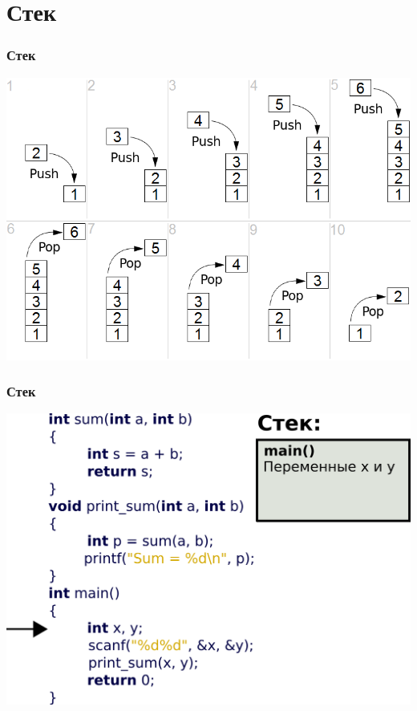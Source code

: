 \documentclass[12pt,pdf,hyperref={unicode}]{beamer}
\begin{document}
\section{Стек}

\begin{frame}[fragile]
\frametitle{Стек} 
\begin{center}
\includegraphics[width=\linewidth]{images/Lifo_stack.png}
\end{center}
\end{frame}

\begin{frame}[fragile]
\frametitle{Стек} 
\begin{center}
\includegraphics[width=\linewidth]{images/stack1.png}
\end{center}
\end{frame}
\end{document}
